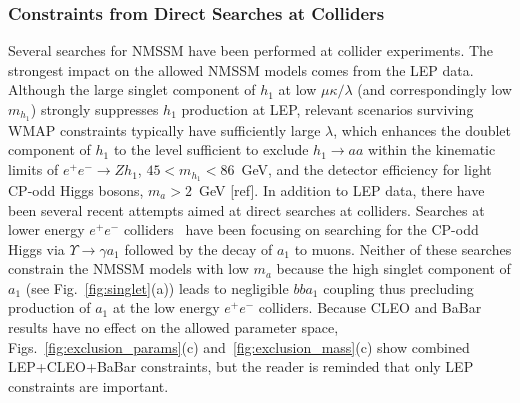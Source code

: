 \documentclass[aps,prl,nofootinbib,superscriptaddress]{revtex4}
\begin{document}
\begin{figure*}[t]
\caption{Sampled points with $m_a < 2m_\tau$ and experimental constraints successively applied 
similar to Fig.~\ref{fig:exclusion_params} but in $m_a$ vs.\ $m_h$ space.  Note that the low 
energy $e^+e^-$ data (CLEO and BaBar) have essentially no impact on the allowed parameter space. 
Color scale is number density and filled points are 100 models (before application of experimental 
constraints). \label{fig:exclusion_mass}}
\end{figure*}

\subsubsection{Constraints from Direct Searches at Colliders}

Several searches for NMSSM have been performed at collider experiments. The strongest impact on the allowed NMSSM models
comes from the LEP data. Although the large singlet component of $h_1$ at low $\mu\kappa/\lambda$ (and correspondingly 
low $m_{h_1}$) strongly suppresses $h_1$ production at LEP, relevant scenarios surviving WMAP constraints typically 
have sufficiently large $\lambda$, which enhances the doublet component of $h_1$ to the level sufficient to exclude 
$h_1 \to aa$ within the kinematic limits of $e^+e^- \to Z h_1$, $45 < m_{h_1} < 86$~GeV, and the detector efficiency 
for light CP-odd Higgs bosons, $m_a > 2$~GeV [ref]. In addition to LEP data, there have been several recent attempts 
aimed at direct searches at colliders. Searches at lower energy $e^+e^-$ colliders~\cite{cleo-low-ma,babar-low-ma} 
have been focusing on searching for the CP-odd Higgs via $\Upsilon \to \gamma a_1$ followed by the decay of $a_1$ 
to muons. Neither of these searches constrain the NMSSM models with low $m_a$ because the high singlet component of 
$a_1$ (see Fig.~\ref{fig:singlet}(a)) leads to negligible $bba_1$ coupling thus precluding production of $a_1$
at the low energy $e^+e^-$ colliders. Because CLEO and BaBar results have no effect on the allowed parameter space,
Figs.~\ref{fig:exclusion_params}(c) and~\ref{fig:exclusion_mass}(c) show combined LEP+CLEO+BaBar constraints, but 
the reader is reminded that only LEP constraints are important.
\end{document}
